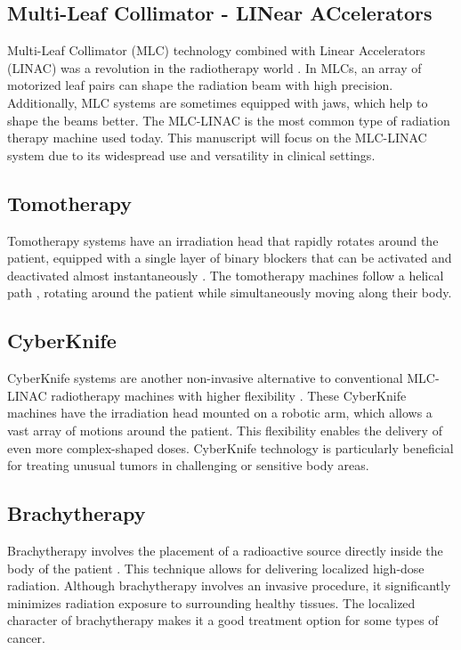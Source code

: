 \subsection[MLC-LINAC]{Multi-Leaf Collimator - LINear ACcelerators}
Multi-Leaf Collimator (MLC) technology combined with Linear Accelerators (LINAC) was a revolution in the radiotherapy world \cite{Bakiu2013} \cite{Xu2017}.
In MLCs, an array of motorized leaf pairs can shape the radiation beam with high precision.
Additionally, MLC systems are sometimes equipped with jaws, which help to shape the beams better.
The MLC-LINAC is the most common type of radiation therapy machine used today.
This manuscript will focus on the MLC-LINAC system due to its widespread use and versatility in clinical settings.

\subsection{Tomotherapy}
Tomotherapy systems have an irradiation head that rapidly rotates around the patient, equipped with a single layer of binary blockers that can be activated and deactivated almost instantaneously \cite{Mackie1999}.
The tomotherapy machines follow a helical path \cite{Jeraj2004}, rotating around the patient while simultaneously moving along their body.

\subsection{CyberKnife}
CyberKnife systems are another non-invasive alternative to conventional MLC-LINAC radiotherapy machines with higher flexibility \cite{Kilby2020}.
These CyberKnife machines have the irradiation head mounted on a robotic arm, which allows a vast array of motions around the patient.
This flexibility enables the delivery of even more complex-shaped doses.
CyberKnife technology is particularly beneficial for treating unusual tumors in challenging or sensitive body areas.

\subsection{Brachytherapy}
Brachytherapy involves the placement of a radioactive source directly inside the body of the patient \cite{Chargari2019}.
This technique allows for delivering localized high-dose radiation.
Although brachytherapy involves an invasive procedure, it significantly minimizes radiation exposure to surrounding healthy tissues.
The localized character of brachytherapy makes it a good treatment option for some types of cancer.

